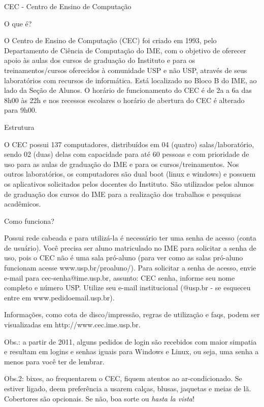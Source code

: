 \begin{secao}{CEC - Centro de Ensino de Computação}

\begin{subsecao}{O que é?}

O Centro de Ensino de Computação (CEC) foi criado em 1993, pelo
Departamento de Ciência de Computação do IME, com o objetivo de
oferecer apoio às aulas dos cursos de graduação do Instituto e para os
treinamentos/cursos oferecidos à comunidade USP e não USP, através de
seus laboratórios com recursos de informática.
Está localizado no Bloco B do IME, ao lado da Seção de Alunos. O horário
de funcionamento do CEC é de 2a a 6a das 8h00 às 22h e nos recessos
escolares o horário de abertura do CEC é alterado para 9h00.

\end{subsecao}

\begin{subsecao}{Estrutura}

O CEC possui 137 computadores, distribuídos em 04 (quatro)
salas/laboratório, sendo 02 (duas) delas com capacidade para até 60
pessoas e com prioridade de uso para as aulas de graduação do IME e
para os cursos/treinamentos.
Nos outros laboratórios, os computadores são dual boot (linux e windows) e
possuem os aplicativos solicitados pelos docentes do Instituto. São
utilizados pelos alunos de graduação dos cursos do IME para a realização
dos trabalhos e pesquisas acadêmicos.

\end{subsecao}

\begin{subsecao}{Como funciona?}

Possui rede cabeada e para utilizá-la é necessário ter uma senha de
acesso (conta de usuário). Você precisa ser aluno matriculado no IME para
solicitar a senha de uso, pois o CEC não é uma sala pró-aluno (para ver
como as salas pró-aluno funcionam acesse www.usp.br/proaluno/). 
Para solicitar a senha de acesso, envie e-mail para cec-senha@ime.usp.br,
assunto: CEC senha, informe seu nome completo e número USP. Utilize
seu e-mail institucional (@usp.br - se esqueceu entre em
www.pedidoemail.usp.br).

Informações, como cota de disco/impressão, regras de utilização e faqs,
podem ser visualizadas em http://www.cec.ime.usp.br.

\end{subsecao}

Obs.: a partir de 2011, alguns pedidos de login são recebidos com maior simpatia
e resultam em logins e senhas iguais para Windows e Linux, ou seja, uma senha a
menos para você ter de lembrar.

Obs.2: bixes, ao frequentarem o CEC, fiquem atentos ao ar-condicionado. Se
estiver ligado, deem preferência a usarem calças, blusas, jaquetas e meias de
lã. Cobertores são opcionais. Se não, boa sorte ou \textit{hasta la vista}!

\end{secao}
